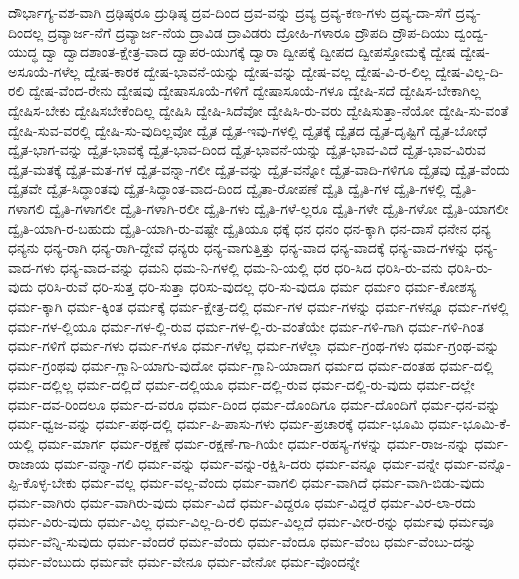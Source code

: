 {ದೌರ್ಭಾಗ್ಯ-ವಶ-ವಾಗಿ
ದ್ರಢಿಷ್ಠರೂ
ದ್ರುಢಿಷ್ಠ
ದ್ರವ-ದಿಂದ
ದ್ರವ-ವನ್ನು
ದ್ರವ್ಯ
ದ್ರವ್ಯ-ಕಣ-ಗಳು
ದ್ರವ್ಯ-ದಾ-ಸೆಗೆ
ದ್ರವ್ಯ-ದಿಂದಲ್ಲ
ದ್ರವ್ಯಾರ್ಜ-ನೆಗೆ
ದ್ರವ್ಯಾರ್ಜ-ನೆಯ
ದ್ರಾವಿಡ
ದ್ರಾವಿಡರು
ದ್ರೋಹಿ-ಗಳಾರೂ
ದ್ರೌಪದಿ
ದ್ರೌಪ-ದಿಯು
ದ್ವಂದ್ವ-ಯುದ್ಧ
ದ್ವಾ
ದ್ವಾದಶಾಂತ-ಕ್ಷೇತ್ರ-ವಾದ
ದ್ವಾಪರ-ಯುಗಕ್ಕೆ
ದ್ವಾರಾ
ದ್ವೀಪಕ್ಕೆ
ದ್ವೀಪದ
ದ್ವೀಪಸ್ತೋಮಕ್ಕೆ
ದ್ವೇಷ
ದ್ವೇಷ-ಅಸೂಯೆ-ಗಳೆಲ್ಲ
ದ್ವೇಷ-ಕಾರಕ
ದ್ವೇಷ-ಭಾವನೆ-ಯನ್ನು
ದ್ವೇಷ-ವನ್ನು
ದ್ವೇಷ-ವಲ್ಲ
ದ್ವೇಷ-ವಿ-ರ-ಲಿಲ್ಲ
ದ್ವೇಷ-ವಿಲ್ಲ-ದಿ-ರಲಿ
ದ್ವೇಷ-ವೆಂದ-ರೇನು
ದ್ವೇಷವು
ದ್ವೇಷಾಸೂಯೆ-ಗಳಿಗೆ
ದ್ವೇಷಾಸೂಯೆ-ಗಳೂ
ದ್ವೇಷಿ-ಸದೆ
ದ್ವೇಷಿಸ-ಬೇಕಾಗಿಲ್ಲ
ದ್ವೇಷಿಸ-ಬೇಕು
ದ್ವೇಷಿಸಬೇಕೆಂದಿಲ್ಲ
ದ್ವೇಷಿಸಿ
ದ್ವೇಷಿ-ಸಿದೆವೋ
ದ್ವೇಷಿಸಿ-ರು-ವರು
ದ್ವೇಷಿಸುತ್ತಾ-ನೆಯೋ
ದ್ವೇಷಿ-ಸು-ವಂತೆ
ದ್ವೇಷಿ-ಸುವ-ವರಲ್ಲಿ
ದ್ವೇಷಿ-ಸು-ವುದಿಲ್ಲವೋ
ದ್ವೈತ
ದ್ವೈತ-ಇವು-ಗಳಲ್ಲಿ
ದ್ವೈತಕ್ಕೆ
ದ್ವೈತದ
ದ್ವೈತ-ದೃಷ್ಟಿಗೆ
ದ್ವೈತ-ಬೋಧೆ
ದ್ವೈತ-ಭಾಗ-ವನ್ನು
ದ್ವೈತ-ಭಾವಕ್ಕೆ
ದ್ವೈತ-ಭಾವ-ದಿಂದ
ದ್ವೈತ-ಭಾವನೆ-ಯನ್ನು
ದ್ವೈತ-ಭಾವ-ವಿದೆ
ದ್ವೈತ-ಭಾವ-ವಿರುವ
ದ್ವೈತ-ಮತಕ್ಕೆ
ದ್ವೈತ-ಮತ-ಗಳ
ದ್ವೈತ-ವನ್ನಾ-ಗಲೀ
ದ್ವೈತ-ವನ್ನು
ದ್ವೈತ-ವನ್ನೋ
ದ್ವೈತ-ವಾದಿ-ಗಳಿಗೂ
ದ್ವೈತವು
ದ್ವೈತ-ವೆಂದು
ದ್ವೈತವೇ
ದ್ವೈತ-ಸಿದ್ಧಾಂತವು
ದ್ವೈತ-ಸಿದ್ಧಾಂತ-ವಾದ-ದಿಂದ
ದ್ವೈತಾ-ರೋಪಣೆ
ದ್ವೈತಿ
ದ್ವೈತಿ-ಗಳ
ದ್ವೈತಿ-ಗಳಲ್ಲಿ
ದ್ವೈತಿ-ಗಳಾಗಲಿ
ದ್ವೈತಿ-ಗಳಾಗಲೀ
ದ್ವೈತಿ-ಗಳಾಗಿ-ರಲೀ
ದ್ವೈತಿ-ಗಳು
ದ್ವೈತಿ-ಗಳೆ-ಲ್ಲರೂ
ದ್ವೈತಿ-ಗಳೇ
ದ್ವೈತಿ-ಗಳೋ
ದ್ವೈತಿ-ಯಾಗಲೀ
ದ್ವೈತಿ-ಯಾಗಿ-ರ-ಬಹುದು
ದ್ವೈತಿ-ಯಾಗಿ-ರು-ವಷ್ಟೇ
ದ್ವೈತಿಯೂ
ಧಕ್ಕೆ
ಧನ
ಧನಂ
ಧನ-ಕ್ಕಾಗಿ
ಧನ-ದಾಸೆ
ಧನೇನ
ಧನ್ಯ
ಧನ್ಯನು
ಧನ್ಯ-ರಾಗಿ
ಧನ್ಯ-ರಾಗಿ-ದ್ದೇವೆ
ಧನ್ಯರು
ಧನ್ಯ-ವಾಗುತ್ತಿತ್ತು
ಧನ್ಯ-ವಾದ
ಧನ್ಯ-ವಾದಕ್ಕೆ
ಧನ್ಯ-ವಾದ-ಗಳನ್ನು
ಧನ್ಯ-ವಾದ-ಗಳು
ಧನ್ಯ-ವಾದ-ವನ್ನು
ಧಮನಿ
ಧಮ-ನಿ-ಗಳಲ್ಲಿ
ಧಮ-ನಿ-ಯಲ್ಲಿ
ಧರ
ಧರಿ-ಸಿದ
ಧರಿಸಿ-ರು-ವನು
ಧರಿಸಿ-ರು-ವುದು
ಧರಿಸಿ-ರುವೆ
ಧರಿ-ಸುತ್ತ
ಧರಿ-ಸುತ್ತಾ
ಧರಿಸು-ವುದಲ್ಲ
ಧರಿ-ಸು-ವುದೂ
ಧರ್ಮ
ಧರ್ಮಂ
ಧರ್ಮ-ಕೋಶಸ್ಯ
ಧರ್ಮ-ಕ್ಕಾಗಿ
ಧರ್ಮ-ಕ್ಕಿಂತ
ಧರ್ಮಕ್ಕೆ
ಧರ್ಮ-ಕ್ಷೇತ್ರ-ದಲ್ಲಿ
ಧರ್ಮ-ಗಳ
ಧರ್ಮ-ಗಳನ್ನು
ಧರ್ಮ-ಗಳನ್ನೂ
ಧರ್ಮ-ಗಳಲ್ಲಿ
ಧರ್ಮ-ಗಳ-ಲ್ಲಿಯೂ
ಧರ್ಮ-ಗಳ-ಲ್ಲಿ-ರುವ
ಧರ್ಮ-ಗಳ-ಲ್ಲಿ-ರು-ವಂತೆಯೇ
ಧರ್ಮ-ಗಳಿ-ಗಾಗಿ
ಧರ್ಮ-ಗಳಿ-ಗಿಂತ
ಧರ್ಮ-ಗಳಿಗೆ
ಧರ್ಮ-ಗಳು
ಧರ್ಮ-ಗಳೂ
ಧರ್ಮ-ಗಳೆಲ್ಲ
ಧರ್ಮ-ಗಳೆಲ್ಲಾ
ಧರ್ಮ-ಗ್ರಂಥ-ಗಳು
ಧರ್ಮ-ಗ್ರಂಥ-ವನ್ನು
ಧರ್ಮ-ಗ್ರಂಥವು
ಧರ್ಮ-ಗ್ಲಾನಿ-ಯಾಗು-ವುದೋ
ಧರ್ಮ-ಗ್ಲಾನಿ-ಯಾದಾಗ
ಧರ್ಮದ
ಧರ್ಮ-ದಂತಹ
ಧರ್ಮ-ದಲ್ಲಿ
ಧರ್ಮ-ದಲ್ಲಿಲ್ಲ
ಧರ್ಮ-ದಲ್ಲಿದೆ
ಧರ್ಮ-ದಲ್ಲಿಯೂ
ಧರ್ಮ-ದಲ್ಲಿ-ರುವ
ಧರ್ಮ-ದಲ್ಲಿ-ರು-ವುದು
ಧರ್ಮ-ದಲ್ಲೇ
ಧರ್ಮ-ದವ-ರಿಂದಲೂ
ಧರ್ಮ-ದ-ವರೂ
ಧರ್ಮ-ದಿಂದ
ಧರ್ಮ-ದೊಂದಿಗೂ
ಧರ್ಮ-ದೊಂದಿಗೆ
ಧರ್ಮ-ಧನ-ವನ್ನು
ಧರ್ಮ-ಧ್ವಜ-ವನ್ನು
ಧರ್ಮ-ಪಥ-ದಲ್ಲಿ
ಧರ್ಮ-ಪಿ-ಪಾಸು-ಗಳು
ಧರ್ಮ-ಪ್ರಚಾರಕ್ಕೆ
ಧರ್ಮ-ಭೂಮಿ
ಧರ್ಮ-ಭೂಮಿ-ಕೆ-ಯಲ್ಲಿ
ಧರ್ಮ-ಮಾರ್ಗ
ಧರ್ಮ-ರಕ್ಷಣೆ
ಧರ್ಮ-ರಕ್ಷಣೆ-ಗಾ-ಗಿಯೇ
ಧರ್ಮ-ರಹಸ್ಯ-ಗಳನ್ನು
ಧರ್ಮ-ರಾಜ-ನನ್ನು
ಧರ್ಮ-ರಾಜಾಯ
ಧರ್ಮ-ವನ್ನಾ-ಗಲಿ
ಧರ್ಮ-ವನ್ನು
ಧರ್ಮ-ವನ್ನು-ರಕ್ಷಿಸಿ-ದರು
ಧರ್ಮ-ವನ್ನೂ
ಧರ್ಮ-ವನ್ನೇ
ಧರ್ಮ-ವನ್ನೊ-ಪ್ಪಿ-ಕೊಳ್ಳ-ಬೇಕು
ಧರ್ಮ-ವಲ್ಲ
ಧರ್ಮ-ವಲ್ಲ-ವೆಂದು
ಧರ್ಮ-ವಾಗಲಿ
ಧರ್ಮ-ವಾಗಿದೆ
ಧರ್ಮ-ವಾಗಿ-ಬಿಡು-ವುದು
ಧರ್ಮ-ವಾಗಿರು
ಧರ್ಮ-ವಾಗಿರು-ವುದು
ಧರ್ಮ-ವಿದೆ
ಧರ್ಮ-ವಿದ್ದರೂ
ಧರ್ಮ-ವಿದ್ದರೆ
ಧರ್ಮ-ವಿರ-ಲಾ-ರದು
ಧರ್ಮ-ವಿರು-ವುದು
ಧರ್ಮ-ವಿಲ್ಲ
ಧರ್ಮ-ವಿಲ್ಲ-ದಿ-ರಲಿ
ಧರ್ಮ-ವಿಲ್ಲದೆ
ಧರ್ಮ-ವೀರ-ರನ್ನು
ಧರ್ಮವು
ಧರ್ಮವೂ
ಧರ್ಮ-ವೆನ್ನಿ-ಸುವುದು
ಧರ್ಮ-ವೆಂದರೆ
ಧರ್ಮ-ವೆಂದು
ಧರ್ಮ-ವೆಂದೂ
ಧರ್ಮ-ವೆಂಬ
ಧರ್ಮ-ವೆಂಬು-ದನ್ನು
ಧರ್ಮ-ವೆಂಬುದು
ಧರ್ಮವೇ
ಧರ್ಮ-ವೇನೂ
ಧರ್ಮ-ವೇನೋ
ಧರ್ಮ-ವೊಂದನ್ನೇ
}
